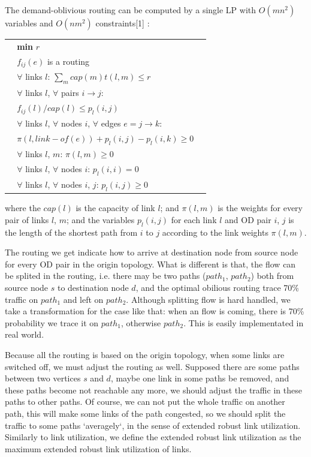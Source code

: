 \documentclass[conference]{IEEEtran}
\begin{document}
The demand-oblivious routing can be computed by a single LP with $O(mn^2)$ variables and $O(nm^2)$ constraints[1] :
\begin{table}[!th]
\begin{tabular}{ll}
$\:\:$\quad\quad\quad\quad\ \textbf{min} $r$ \\
$\:\:$\quad\quad\quad\quad\ $f_{ij}(e)$ is a routing \\
$\:\:$\quad\quad\quad\quad\ $\forall$ links $l$: $\sum_m cap(m)t(l,m) \le r$ \\
$\:\:$\quad\quad\quad\quad\ $\forall$ links $l$, $\forall$ pairs $i \rightarrow j$: \\
$\:\:$\quad\quad\quad\quad\quad\quad\ $f_{ij}(l)/cap(l) \le p_l(i,j)$ \\
$\:\:$\quad\quad\quad\quad\ $\forall$ links $l$, $\forall$ nodes $i$, $\forall$ edges $e = j \rightarrow k$: \\
$\:\:$\quad\quad\quad\quad\quad\quad\ $\pi(l, link-of(e)) + p_l(i,j) - p_l(i,k) \ge 0$ \\
$\:\:$\quad\quad\quad\quad\ $\forall$ links $l$, $m$: $\pi(l, m) \ge 0$ \\
$\:\:$\quad\quad\quad\quad\ $\forall$ links $l$, $\forall$ nodes $i$: $p_l(i,i) = 0$ \\
$\:\:$\quad\quad\quad\quad\ $\forall$ links $l$, $\forall$ nodes $i$, $j$: $p_l(i,j) \ge 0$ \\
\end{tabular}
\end{table}


where the $cap(l)$ is the capacity of link $l$;
and $\pi(l,m)$ is the weights for every pair of links $l$, $m$; and the variables $p_l(i,j)$ for each link $l$
and OD pair $i$, $j$ is the length of the shortest path from $i$ to $j$ according to the link weights $\pi(l, m)$.


The routing we get indicate how to arrive at destination node from source node for every OD pair in the origin topology.
What is different is that, the flow can be splited in the routing, i.e. there may be two paths ($path_1$, $path_2$)
both from source node $s$ to destination node $d$, and the optimal obilious routing trace 70\% traffic on
$path_1$ and left on $path_2$. Although splitting flow is hard handled, we take a transformation for the case like that:
when an flow is coming, there is 70\% probability we trace it on $path_1$, otherwise $path_2$. This is easily implementated
in real world.


Because all the routing is based on the origin topology, when some links are switched off, we must adjust the routing
as well. Supposed there are some paths between two vertices $s$ and $d$, maybe one link in some paths be removed,
and these paths become not reachable any more, we should adjust the traffic in these paths to other paths. Of course,
we can not put the whole traffic on another path, this will make some links of the path congested, so we should split the traffic
to some paths `averagely`, in the sense of extended robust link utilization. Similarly to link utilization, we define the extended
robust link utilization as the maximum extended robust link utilization of links.
\end{document}

